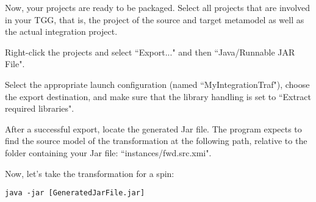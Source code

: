 \begin{stepbystep}
\item 
Now, your projects are ready to be packaged.
Select all projects that are involved in your TGG, that is, the project of the source and target metamodel as well as the actual integration project.

Right-click the projects and select ``Export..." and then ``Java/Runnable JAR File".

\item 
Select the appropriate launch configuration (named ``MyIntegrationTraf"), choose the export destination, and make sure that the library handling is set to ``Extract required libraries".

\item 
After a successful export, locate the generated Jar file.
The program expects to find the source model of the transformation at the following path, relative to the folder containing your Jar file: ``instances/fwd.src.xmi".

Now, let's take the transformation for a spin:
\begin{lstlisting}
java -jar [GeneratedJarFile.jar]
\end{lstlisting}

\end{stepbystep}



   
